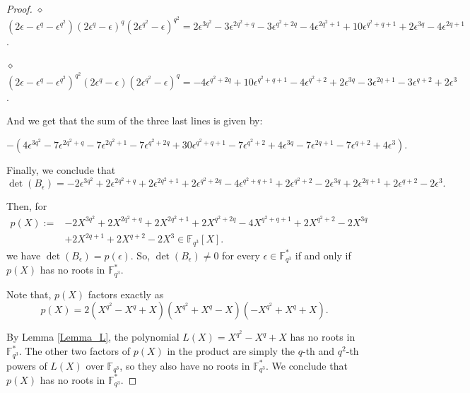 \documentclass[12pt]{amsart}
\def\e{\epsilon}
\newcommand{\F}{\mathbb{F}}
\def\e{\epsilon}
\begin{document}
\begin{proof}
	\medskip
	
	$\diamond$ $(2 \epsilon - \epsilon^q - \epsilon^{q^2}) (2\epsilon^q -\epsilon)^{q} (2\epsilon^{q^2} - \epsilon)^{q^2} = 2\e^{3q^2} -3\e^{2q^2 + q} - 3 \e^{q^2 + 2q} - 4\e^{2q^2 + 1} + 10 \e^{q^2 + q + 1}+2\e^{3q} -4\e^{2q+1}$.
	
	\medskip
	
	$\diamond$ $(2 \epsilon - \epsilon^q - \epsilon^{q^2})^{q^2} (2\epsilon^q -\epsilon) (2\epsilon^{q^2} - \epsilon)^q = -4\e^{q^2 + 2q} + 10 \e^{q^2 + q + 1} - 4 \e^{q^2 + 2} + 2 \e^{3q} - 3\e^{2q+1} -3\e^{q+2} + 2\e^3$.
	
	\medskip
	
	And we get that the sum of the three last lines is given by:
	
	$-(	4\e^{3q^{2}} - 7\e^{2q^{2}+q} - 7\e^{2q^{2}+1} - 7\e^{q^{2}+2q} + 30\e^{q^{2}+q+1} - 7\e^{q^{2}+2} + 4\e^{3q} - 7\e^{2q+1} - 7\e^{q+2} + 4\e^{3}).$
	
	\medskip
	
	
	Finally, we conclude that
	$$
	\det(B_{\e}) = -2\e^{3q^2} + 2 \e^{2q^2 + q} + 2 \e^{2q^2 + 1} + 2 \e^{q^2 + 2q} -4\e^{q^2 + q + 1} + 2\e^{q^2 + 2} -2\e^{3q} + 2 \e^{2q+1} + 2 \e^{q+2} -2\e^3.
	$$
	
	
	
	
	
	
	
	
	Then, for 
	$$
	\begin{array}{rl}
		p(X):=& -2X^{3q^2} + 2 X^{2q^2 + q} + 2 X^{2q^2 + 1} + 2 X^{q^2 + 2q} -4X^{q^2 + q + 1} + 2X^{q^2 + 2} -2X^{3q}  \\
		& + 2 X^{2q+1} + 2 X^{q+2} -2X^3 \in \mathbb{F}_{q^3}[X].
	\end{array}
	$$
	we have  $\det(B_{\e}) = p(\e)$. So, $\det(B_{\e}) \neq 0$ for every $\e \in \mathbb{F}_{q^3}^{\ast}$ if and only if $p(X)$ has no roots in $\mathbb{F}_{q^3}^{\ast}$.
	
	Note that, $p(X)$ factors exactly as 
	$$p(X) = 2 (X^{q^2}-X^q+X)(X^{q^2}+X^q - X)(-X^{q^2}+X^q + X).$$
	
	By Lemma \ref{Lemma_L}, the polynomial $L(X)=X^{q^2}-X^q+X$  has no roots in $\mathbb{F}_{q^3}^*$. 
	The other two factors of $p(X)$ in the product are simply the $q$-th and $q^2$-th powers of $L(X)$ over $\F_{q^3}$, so they also have no roots in $\mathbb{F}_{q^3}^*$. We conclude that $p(X)$ has no roots in $\mathbb{F}_{q^3}^{\ast}$. 
	
\end{proof}

	
	
\end{document}

